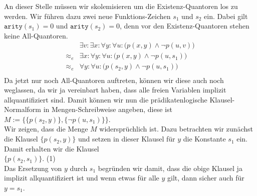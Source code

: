 An dieser Stelle müssen wir skolemisieren um die Existenz-Quantoren los zu werden. 
Wir führen dazu zwei neue Funktions-Zeichen $s_1$ und $s_2$ ein. 
Dabei gilt $\mathtt{arity}(s_1) = 0$ und $\mathtt{arity}(s_2) = 0$, denn vor den
Existenz-Quantoren stehen keine All-Quantoren.
$$
\begin{array}{ll}
           & \exists v\colon  \exists x\colon \forall y\colon \forall u\colon \Big( p(x,y) \wedge \neg p(u,v) \Big)\\
 \approx_e & \exists x\colon \forall y\colon \forall u\colon \Big( p(x,y) \wedge \neg p(u,s_1) \Big)\\
 \approx_e & \forall y\colon \forall u\colon \Big( p(s_2,y) \wedge \neg p(u,s_1) \Big)\\
\end{array}
$$
Da jetzt nur noch All-Quantoren auftreten, können wir diese auch noch weglassen,
da wir ja vereinbart haben, dass alle freien Variablen implizit allquantifiziert sind.
Damit können wir nun die prädikatenlogische Klausel-Normalform in Mengen-Schreibweise angeben, diese
ist
\\[0.2cm] 
\hspace*{1.3cm}
$M := \Big\{ \big\{ p(s_2,y) \big\}, \big\{\neg p(u,s_1)\big\}\Big\}$.
\\[0.2cm]
Wir zeigen, dass die Menge $M$ widersprüchlich ist.
Dazu betrachten wir zunächst die Klausel $\big\{ p(s_2,y) \big\}$ und setzen in
dieser Klausel für $y$ die Konstante $s_1$ ein.  Damit erhalten wir die Klausel \\[0.2cm]
\hspace*{1.3cm}  $\big\{ p(s_2,s_1) \big\}$. \hspace*{\fill}(1)\\[0.2cm]
Das Ersetzung von $y$ durch $s_1$ begründen wir damit, dass die obige Klausel ja implizit
allquantifiziert ist und wenn etwas für alle $y$ gilt, dann sicher auch für $y = s_1$.

